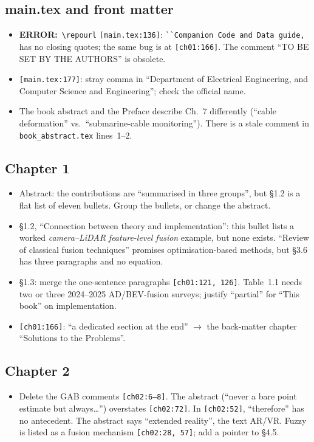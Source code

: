 \documentclass[10pt,a4paper]{article}
\newcommand{\src}[1]{{\footnotesize\texttt{[#1]}}}
\newcommand{\err}{\textbf{ERROR:}~}
\begin{document}
\subsection*{main.tex and front matter}
\begin{itemize}
\item \err \verb|\repourl| \src{main.tex:136}: \verb|``Companion Code and Data guide,| has no closing quotes; the same bug is at \src{ch01:166}. The comment ``TO BE SET BY THE AUTHORS'' is obsolete.
\item \src{main.tex:177}: stray comma in ``Department of Electrical Engineering, and Computer Science and Engineering''; check the official name.
\item The book abstract and the Preface describe Ch.~7 differently (``cable deformation'' vs.\ ``submarine-cable monitoring''). There is a stale comment in \texttt{book\_abstract.tex} lines~1--2.
\end{itemize}

\subsection*{Chapter 1}
\begin{itemize}
\item Abstract: the contributions are ``summarised in three groups'', but \S1.2 is a flat list of eleven bullets. Group the bullets, or change the abstract.
\item \S1.2, ``Connection between theory and implementation'': this bullet lists a worked \emph{camera--LiDAR feature-level fusion} example, but none exists. ``Review of classical fusion techniques'' promises optimisation-based methods, but \S3.6 has three paragraphs and no equation.
\item \S1.3: merge the one-sentence paragraphs \src{ch01:121, 126}. Table~1.1 needs two or three 2024--2025 AD/BEV-fusion surveys; justify ``partial'' for ``This book'' on implementation.
\item \src{ch01:166}: ``a dedicated section at the end'' $\to$ the back-matter chapter ``Solutions to the Problems''.
\end{itemize}

\subsection*{Chapter 2}
\begin{itemize}
\item Delete the GAB comments \src{ch02:6--8}. The abstract (``never a bare point estimate but always\ldots'') overstates \src{ch02:72}. In \src{ch02:52}, ``therefore'' has no antecedent. The abstract says ``extended reality'', the text AR/VR. Fuzzy is listed as a fusion mechanism \src{ch02:28, 57}; add a pointer to \S4.5.
\end{itemize}
\end{document}
